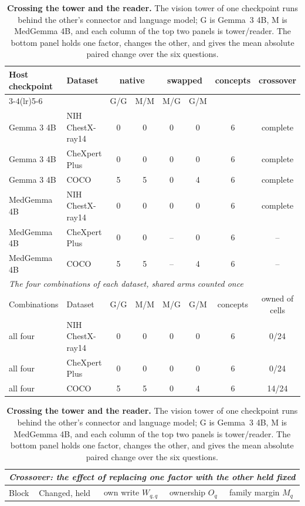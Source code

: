 \documentclass{article}
\begin{document}
\begin{table}[htbp]
\centering
\scriptsize
\setlength{\tabcolsep}{4pt}
\caption{\textbf{Crossing the tower and the reader.} The vision tower of one checkpoint runs behind the other's connector and language model; G is Gemma~3 4B, M is MedGemma 4B, and each column of the top two panels is tower/reader. The bottom panel holds one factor, changes the other, and gives the mean absolute paired change over the six questions.}
\label{tab:cf-towerswap}
\begin{tabular}{llcccccc}
\toprule
\multirow{2}{*}{Host checkpoint} & \multirow{2}{*}{Dataset} & \multicolumn{2}{c}{native} & \multicolumn{2}{c}{swapped} & \multirow{2}{*}{concepts} & \multirow{2}{*}{crossover}\\
\cmidrule(lr){3-4}\cmidrule(lr){5-6}
&  & \multicolumn{1}{c}{G/G} & \multicolumn{1}{c}{M/M} & \multicolumn{1}{c}{M/G} & \multicolumn{1}{c}{G/M} &  & \\
\midrule
Gemma 3 4B & NIH ChestX-ray14 & 0 & 0 & 0 & 0 & 6 & complete \\
Gemma 3 4B & CheXpert Plus & 0 & 0 & 0 & 0 & 6 & complete \\
Gemma 3 4B & COCO & 5 & 5 & 0 & 4 & 6 & complete \\
MedGemma 4B & NIH ChestX-ray14 & 0 & 0 & 0 & 0 & 6 & complete \\
MedGemma 4B & CheXpert Plus & 0 & 0 & -- & 0 & 6 & -- \\
MedGemma 4B & COCO & 5 & 5 & -- & 4 & 6 & -- \\
\midrule
\multicolumn{8}{l}{\textit{The four combinations of each dataset, shared arms counted once}} \\
Combinations & Dataset & G/G & M/M & M/G & G/M & concepts & owned of cells \\
\midrule
all four & NIH ChestX-ray14 & 0 & 0 & 0 & 0 & 6 & 0/24 \\
all four & CheXpert Plus & 0 & 0 & 0 & 0 & 6 & 0/24 \\
all four & COCO & 5 & 5 & 0 & 4 & 6 & 14/24 \\
\bottomrule
\end{tabular}
\vspace{4pt}
\setlength{\tabcolsep}{2.5pt}
\begin{tabular}{llccc}
\toprule
\multicolumn{5}{l}{\textit{Crossover: the effect of replacing one factor with the other held fixed}} \\
\midrule
Block & Changed, held & own write $W_{q,q}$ & ownership $O_q$ & family margin $M_q$ \\

\end{tabular}
\end{table}
\end{document}
